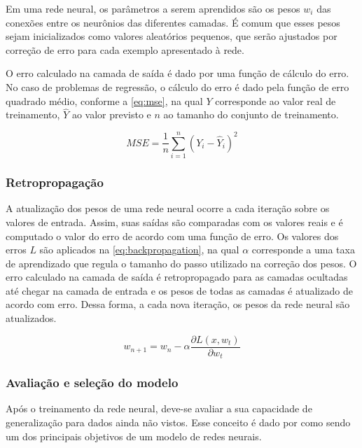 \documentclass[
    12pt,
    oneside,
    a4paper,
    english,
    brazil
]{abntex2}
\begin{document}
Em uma  rede neural, os  parâmetros a serem aprendidos  são os pesos  $w_i$ das
conexões entre  os neurônios das  diferentes camadas.  É comum que  esses pesos
sejam inicializados como  valores aleatórios pequenos, que  serão ajustados por
correção de erro para cada exemplo apresentado à rede.

O erro calculado na  camada de saída é dado por uma função  de cálculo do erro.
No caso de problemas de regressão, o cálculo do erro é dado pela função de erro
quadrado médio, conforme  a \autoref{eq:mse}, na qual $Y$  corresponde ao valor
real de treinamento,  $\hat{Y}$ ao valor previsto e $n$  ao tamanho do conjunto
de treinamento.

\begin{equation}\label{eq:mse}
    MSE = \frac{1}{n}\sum_{i=1}^{n}{{(Y_i - \hat{Y}_i)}^2}
\end{equation}

\subsubsection{Retropropagação}

A atualização  dos pesos  de uma rede  neural ocorre a  cada iteração  sobre os
valores de entrada. Assim, suas saídas são  comparadas com os valores reais e é
computado o  valor do erro  de acordo  com uma função  de erro. Os  valores dos
erros  $L$  são aplicados  na  \autoref{eq:backpropagation},  na qual  $\alpha$
corresponde a uma  taxa de aprendizado que regula o  tamanho do passo utilizado
na correção  dos pesos. O  erro calculado na  camada de saída  é retropropagado
para as camadas ocultadas  até chegar na camada de entrada e  os pesos de todas
as camadas é atualizado de acordo com  erro. Dessa forma, a cada nova iteração,
os pesos da rede neural são atualizados.

\begin{equation}\label{eq:backpropagation}
    w_{n+1} = w_n - \alpha \frac{\partial L(x,w_t)}{\partial w_t}
\end{equation}

\subsubsection{Avaliação e seleção do modelo}

Após  o  treinamento da  rede  neural,  deve-se  avaliar  a sua  capacidade  de
generalização  para  dados   ainda  não  vistos.  Esse  conceito   é  dado  por
 como sendo um dos  principais objetivos de um modelo de
redes neurais.
\end{document}
